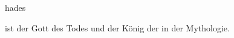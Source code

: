 \documentclass{stex}
\begin{document}
\begin{smodule}[sig=en]{hades}
\begin{sparagraph}[style=symdoc]
 ist der Gott des Todes und der König der
 in der 
Mythologie.
\end{sparagraph}
\end{smodule}
\end{document}
